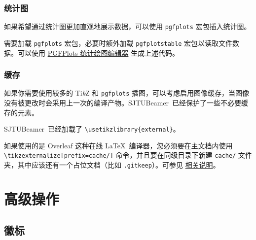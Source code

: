 \documentclass[
    UTF8,
    heading=true,
    12pt,
    a4paper
]{ctexrep}
\def\themename{\textsf{SJTUBeamer}}
\begin{document}
\section{统计图}

如果希望通过统计图更加直观地展示数据，可以使用 \texttt{pgfplots} 宏包插入统计图。


\begin{commentlist}
  \item 需要加载 \texttt{pgfplots} 宏包，必要时额外加载 \texttt{pgfplotstable} 宏包以读取文件数据。可以使用 \href{https://logcreative.github.io/PGFPlotsEdt/}{PGFPlots 统计绘图编辑器} 生成上述代码。
\end{commentlist}

\section{缓存}

如果你需要使用较多的 Ti\emph{k}Z 和 \texttt{pgfplots} 插图，可以考虑启用图像缓存，当图像没有被更改时会采用上一次的编译产物。\themename\ 已经保护了一些不必要缓存的元素。


\begin{commentlist}
  \item \themename\ 已经加载了 \verb"\usetikzlibrary{external}"。
  \item[\faExclamationTriangle] 如果使用的是 Overleaf 这种在线 \LaTeX\ 编译器，您必须要在主文档内使用 \verb"\tikzexternalize[prefix=cache/]" 命令，并且要在同级目录下新建 \verb"cache/" 文件夹，其中应该还有一个占位文档（比如 \verb".gitkeep"）。可参见 \href{https://www.overleaf.com/learn/latex/Questions/I_have_a_lot_of_tikz%2C_matlab2tikz_or_pgfplots_figures%2C_so_I%27m_getting_a_compilation_timeout._Can_I_externalise_my_figures%3F}{相关说明}。
\end{commentlist}


\part{高级操作}
\chapter{徽标}
\end{document}
